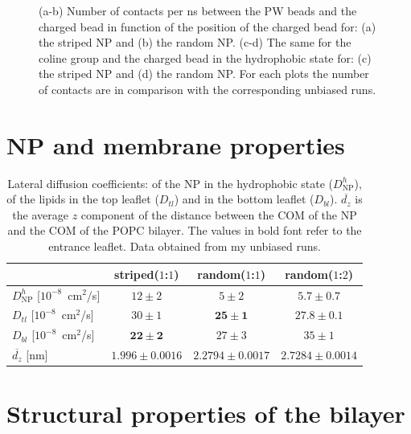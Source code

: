 \begin{figure}[p]
{	}
	\caption{(a-b) Number of contacts per ns between the \acs{PW} beads and the charged bead in function of the position of the charged bead for: (a) the striped \acs{NP} and (b) the random \acs{NP}. (c-d) The same for the coline group and the charged bead  in the hydrophobic state for: (c) the striped \ac{NP} and (d) the random \acs{NP}. For each plots the number of contacts are in comparison with the corresponding unbiased runs.}
\end{figure}
\restoregeometry


\section{NP and membrane properties}

\begin{table}[h!t]
	\centering
	\begin{tabular}{lccc}
		\toprule
		\,		 & striped($1$:$1$)		& random($1$:$1$)		& random($1$:$2$)					\\ \toprule
		$D^h_{\text{NP}}$ [$10^{-8}$~cm$^2$/s] & $12 \pm 2$ & $5 \pm 2$ & $5.7 \pm 0.7$ 				\\ \midrule
		$D_{tl}$ [$10^{-8}$~cm$^2$/s] & $30 \pm 1$ & $\mathbf{25 \pm 1}$ & $\mathbf{27.8 \pm 0.1}$	\\ \midrule
		$D_{bl}$ [$10^{-8}$~cm$^2$/s] & $\mathbf{22 \pm 2}$ & $27 \pm 3$	& $35 \pm 1$			\\ \midrule
		$\overline{d_z}$ [nm] & $1.996 \pm 0.0016$	& $2.2794 \pm 0.0017$	& $2.7284 \pm 0.0014$	\\ \bottomrule
	\end{tabular}
	\caption{Lateral diffusion coefficients: of the \acs{NP} in the hydrophobic state ($D^h_\text{NP}$), of the lipids in the top leaflet ($D_{tl}$) and in the bottom leaflet ($D_{bl}$). $\overline{d_z}$ is the average $z$ component of the distance between the \acs{COM} of the \acs{NP} and the \acs{COM} of the \acs{POPC} bilayer. The values in bold font refer to the entrance leaflet. Data obtained from my unbiased runs.}
	\label{tab:NPMembProperties}
\end{table}


\section{Structural properties of the bilayer}

